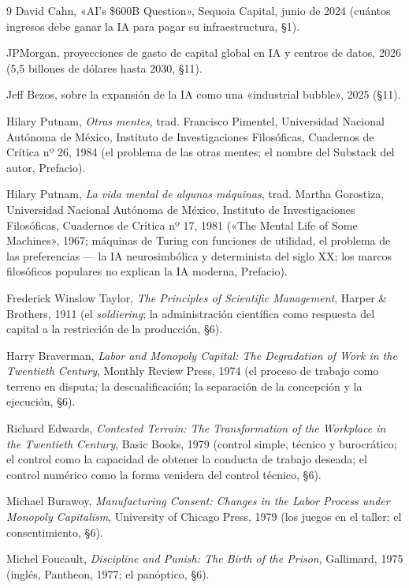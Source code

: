 \documentclass[11pt]{article}
\begin{document}
\begin{thebibliography}{9}
 David Cahn, «AI's \$600B Question», Sequoia
Capital, junio de 2024 (cuántos ingresos debe ganar la IA para pagar su
infraestructura, §1).

 JPMorgan, proyecciones de gasto de capital global
en IA y centros de datos, 2026 (5,5 billones de dólares hasta 2030,
§11).

 Jeff Bezos, sobre la expansión de la IA como una
«industrial bubble», 2025 (§11).

 Hilary Putnam, \textit{Otras mentes}, trad.
Francisco Pimentel, Universidad Nacional Autónoma de México, Instituto
de Investigaciones Filosóficas, Cuadernos de Crítica nº 26, 1984 (el
problema de las otras mentes; el nombre del Substack del autor,
Prefacio).

 Hilary Putnam, \textit{La vida mental de algunas
máquinas}, trad. Martha Gorostiza, Universidad Nacional Autónoma de
México, Instituto de Investigaciones Filosóficas, Cuadernos de Crítica
nº 17, 1981 («The Mental Life of Some Machines», 1967; máquinas de
Turing con funciones de utilidad, el problema de las preferencias ---
la IA neurosimbólica y determinista del siglo XX; los marcos
filosóficos populares no explican la IA moderna, Prefacio).

 Frederick Winslow Taylor, \textit{The Principles
of Scientific Management}, Harper \& Brothers, 1911 (el
\emph{soldiering}; la administración científica como respuesta del
capital a la restricción de la producción, §6).

 Harry Braverman, \textit{Labor and Monopoly
Capital: The Degradation of Work in the Twentieth Century}, Monthly
Review Press, 1974 (el proceso de trabajo como terreno en disputa; la
descualificación; la separación de la concepción y la ejecución, §6).

 Richard Edwards, \textit{Contested Terrain: The
Transformation of the Workplace in the Twentieth Century}, Basic Books,
1979 (control simple, técnico y burocrático; el control como la
capacidad de obtener la conducta de trabajo deseada; el control numérico
como la forma venidera del control técnico, §6).

 Michael Burawoy, \textit{Manufacturing Consent:
Changes in the Labor Process under Monopoly Capitalism}, University of
Chicago Press, 1979 (los juegos en el taller; el consentimiento, §6).

 Michel Foucault, \textit{Discipline and Punish:
The Birth of the Prison}, Gallimard, 1975 (inglés, Pantheon, 1977; el
panóptico, §6).


\end{thebibliography}
\end{document}
